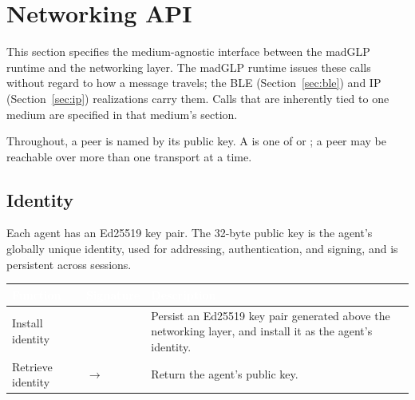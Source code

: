 \section{Networking API}
\label{sec:api}
This section specifies the medium-agnostic interface between the madGLP runtime and the networking layer.  The madGLP runtime issues these calls without regard to how a message travels; the BLE (Section~\ref{sec:ble}) and IP (Section~\ref{sec:ip}) realizations carry them.  Calls that are inherently tied to one medium are specified in that medium's section.

Throughout, a peer is named by its public key.  A  is one of  or ; a peer may be reachable over more than one transport at a time.

\subsection{Identity}
\label{sec:identity}
Each agent has an Ed25519 key pair.  The 32-byte public key is the agent's globally unique identity, used for addressing, authentication, and signing, and is persistent across sessions.
\begin{longtable}{L{4cm} L{4.5cm} L{5.5cm}}
\toprule
{}
\textcolor{white}{\textbf{Function}} &
\textcolor{white}{\textbf{Signature}} &
\textcolor{white}{\textbf{Description}} \\
\midrule
\endhead
Install identity &  & Persist an Ed25519 key pair generated above the networking layer, and install it as the agent's identity. \\
Retrieve identity &  $\to$  & Return the agent's public key. \\
\bottomrule
\end{longtable}

